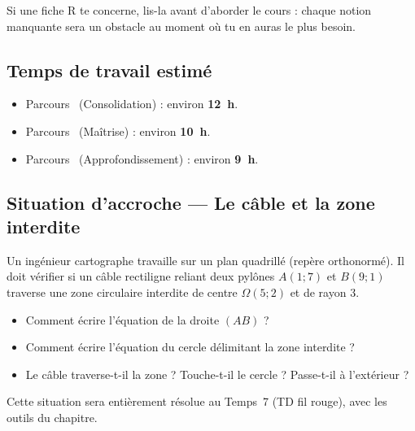 Si une fiche R te concerne, lis-la avant d'aborder le cours : chaque notion manquante sera un obstacle au moment où tu en auras le plus besoin.

\subsection*{Temps de travail estimé}

\begin{itemize}
  \item Parcours~\parcoursUn{} (Consolidation) : environ \textbf{12~h}.
  \item Parcours~\parcoursDeux{} (Maîtrise) : environ \textbf{10~h}.
  \item Parcours~\parcoursTrois{} (Approfondissement) : environ \textbf{9~h}.
\end{itemize}

\subsection*{Situation d'accroche — Le câble et la zone interdite}

Un ingénieur cartographe travaille sur un plan quadrillé (repère orthonormé). Il doit vérifier si un câble rectiligne reliant deux pylônes $A(1 ; 7)$ et $B(9 ; 1)$ traverse une zone circulaire interdite de centre $\Omega(5 ; 2)$ et de rayon $3$.

\begin{itemize}
  \item Comment écrire l'équation de la droite $(AB)$ ?
  \item Comment écrire l'équation du cercle délimitant la zone interdite ?
  \item Le câble traverse-t-il la zone ? Touche-t-il le cercle ? Passe-t-il à l'extérieur ?
\end{itemize}

Cette situation sera entièrement résolue au Temps~7 (TD fil rouge), avec les outils du chapitre.

